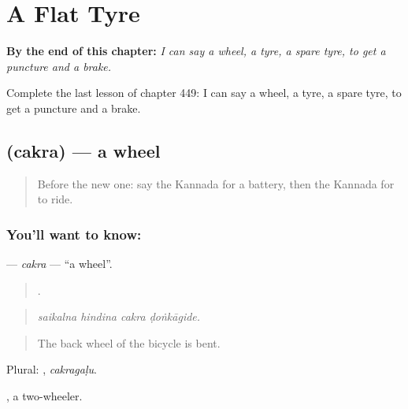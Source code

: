 
\chapter{A Flat Tyre}
\label{ch:ka-a-flat-tyre}

\begin{chapteropening}
\textbf{By the end of this chapter:} \emph{I can say a wheel, a tyre, a spare tyre, to get a puncture and a brake.}

Complete the last lesson of chapter 449: I can say a wheel, a tyre, a spare tyre, to get a puncture and a brake.
\end{chapteropening}

\section[\texorpdfstring{\kn{ಚಕ್ರ} (cakra)}{ಚಕ್ರ (cakra)}]{ (cakra) — a wheel}

\label{lesson:KA-C449-cakra}



\begin{quote}
Before the new one: say the Kannada for a battery, then the Kannada for to ride.
\end{quote}

\subsection*{You'll want to know: }
\textbf{} — \emph{cakra} — \textquotedblleft{}a wheel\textquotedblright{}.

\begin{quote}
   .
\end{quote}

\begin{quote}
\emph{saikalna hindina cakra ḍoṅkāgide.}
\end{quote}

\begin{quote}
The back wheel of the bicycle is bent.
\end{quote}

Plural: , \emph{cakragaḷu}.

 , a two-wheeler.

